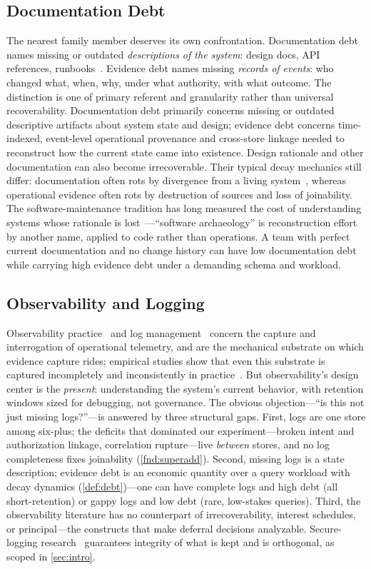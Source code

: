 \subsection{Documentation Debt}
\label{sec:rel-doc}
The nearest family member deserves its own confrontation. Documentation debt names
missing or outdated \emph{descriptions of the system}: design docs, API references,
runbooks~\cite{alves2016}. Evidence debt names missing \emph{records of events}:
who changed what, when, why, under what authority, with what outcome.
The distinction is one of primary referent and granularity rather than universal
recoverability. Documentation debt primarily concerns missing or outdated
descriptive artifacts about system state and design; evidence debt concerns
time-indexed, event-level operational provenance and cross-store linkage needed to
reconstruct how the current state came into existence. Design rationale and other
documentation can also become irrecoverable. Their typical decay mechanics still
differ: documentation often rots by divergence from a living
system~\cite{parnas1994,lehman1980}, whereas operational evidence often rots by
destruction of sources and loss of joinability. The software-maintenance
tradition has long measured the cost of understanding systems whose rationale is
lost~\cite{lientz1980,hunt2002}---``software archaeology'' is reconstruction
effort by another name, applied to code rather than operations. A team with
perfect current documentation and no change history can have low documentation
debt while carrying high evidence debt under a demanding schema and workload.

\subsection{Observability and Logging}
\label{sec:rel-obs}
Observability practice~\cite{majors2022,otel,sigelman2010} and log
management~\cite{nist80092} concern the capture and interrogation of operational
telemetry, and are the mechanical substrate on which evidence capture rides;
empirical studies show that even this substrate is captured incompletely and
inconsistently in practice~\cite{yuan2012}. But
observability's design center is the \emph{present}: understanding the system's
current behavior, with retention windows sized for debugging, not governance. The
obvious objection---``is this not just missing logs?''---is answered by three
structural gaps.
First, logs are one store among six-plus; the deficits that dominated our
experiment---broken intent and authorization linkage, correlation rupture---live
\emph{between} stores, and no log completeness fixes joinability
(\cref{fnd:superadd}). Second, missing logs is a state description; evidence debt
is an economic quantity over a query workload with decay dynamics
(\cref{def:debt})---one can have complete logs and high debt (all short-retention)
or gappy logs and low debt (rare, low-stakes queries). Third, the observability
literature has no counterpart of irrecoverability, interest schedules, or
principal---the constructs that make deferral decisions analyzable. Secure-logging
research~\cite{schneier1999,crosby2009,haber1991} guarantees integrity of what is
kept and is orthogonal, as scoped in \cref{sec:intro}.

